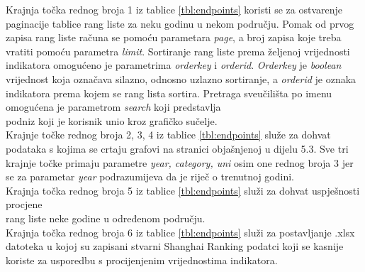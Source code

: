 \documentclass[times, utf8, zavrsni]{fer}
\begin{document}
        \FloatBarrier
Krajnja točka rednog broja 1 iz tablice \ref{tbl:endpoints} koristi se za ostvarenje paginacije tablice rang liste za neku godinu u nekom području.
Pomak od prvog zapisa rang liste računa se pomoću parametara \emph{page}, a broj zapisa koje treba vratiti pomoću parametra \emph{limit}.
Sortiranje rang liste prema željenoj vrijednosti indikatora omogućeno je parametrima \emph{orderkey} i \emph{orderid}.
\emph{Orderkey} je \emph{boolean} vrijednost koja označava silazno, odnosno uzlazno sortiranje, a \emph{orderid} je oznaka indikatora
prema kojem se rang lista sortira. Pretraga sveučilišta po imenu omogućena je parametrom \emph{search} koji predstavlja \\podniz koji je korisnik unio 
kroz grafičko sučelje.
\\

Krajnje točke rednog broja 2, 3, 4 iz tablice \ref{tbl:endpoints} služe za dohvat podataka s kojima se crtaju grafovi na stranici objašnjenoj u 
dijelu 5.3. Sve tri krajnje točke primaju parametre \emph{year, category, uni} osim one rednog broja 3 jer se za parametar \emph{year} podrazumijeva 
da je riječ o trenutnoj godini.
\\

Krajnja točka rednog broja 5 iz tablice \ref{tbl:endpoints} služi za dohvat uspješnosti procjene \\rang liste neke godine u određenom području.
\\

Krajnja točka rednog broja 6 iz tablice \ref{tbl:endpoints} služi za postavljanje .xlsx datoteka u kojoj su zapisani stvarni Shanghai Ranking podatci 
koji se kasnije koriste za usporedbu s procijenjenim vrijednostima indikatora.
\end{document}
